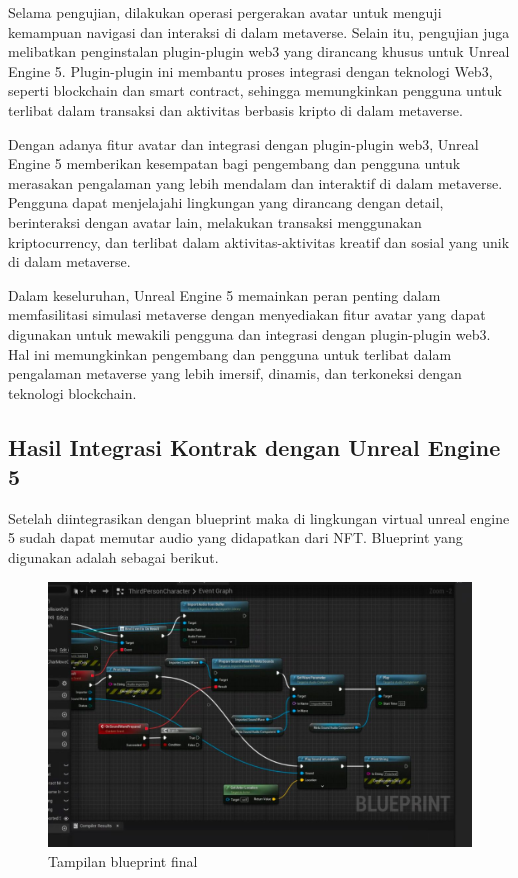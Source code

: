 Selama pengujian, dilakukan operasi pergerakan avatar untuk menguji kemampuan navigasi dan interaksi di dalam metaverse. Selain itu, pengujian juga melibatkan penginstalan plugin-plugin web3 yang dirancang khusus untuk Unreal Engine 5. Plugin-plugin ini membantu proses integrasi dengan teknologi Web3, seperti blockchain dan smart contract, sehingga memungkinkan pengguna untuk terlibat dalam transaksi dan aktivitas berbasis kripto di dalam metaverse.

Dengan adanya fitur avatar dan integrasi dengan plugin-plugin web3, Unreal Engine 5 memberikan kesempatan bagi pengembang dan pengguna untuk merasakan pengalaman yang lebih mendalam dan interaktif di dalam metaverse. Pengguna dapat menjelajahi lingkungan yang dirancang dengan detail, berinteraksi dengan avatar lain, melakukan transaksi menggunakan kriptocurrency, dan terlibat dalam aktivitas-aktivitas kreatif dan sosial yang unik di dalam metaverse.

Dalam keseluruhan, Unreal Engine 5 memainkan peran penting dalam memfasilitasi simulasi metaverse dengan menyediakan fitur avatar yang dapat digunakan untuk mewakili pengguna dan integrasi dengan plugin-plugin web3. Hal ini memungkinkan pengembang dan pengguna untuk terlibat dalam pengalaman metaverse yang lebih imersif, dinamis, dan terkoneksi dengan teknologi blockchain.

\subsection{Hasil Integrasi Kontrak dengan Unreal Engine 5}

Setelah diintegrasikan dengan blueprint maka di lingkungan virtual unreal engine 5 sudah dapat memutar audio yang didapatkan dari NFT.
Blueprint yang digunakan adalah sebagai berikut.

\begin{figure}[H]
  \centering

  \includegraphics[scale=0.35]{gambar/blueprintfinal.jpg}

  \caption{Tampilan blueprint final}
  \label{fig:blueprintfinal}
\end{figure}

